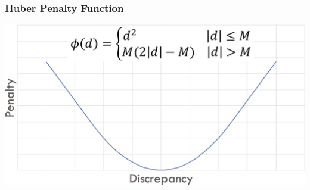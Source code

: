 \begin{frame}
\frametitle{Huber Penalty Function}
  \includegraphics[scale=0.32]{pics/pen3.png}
\end{frame}
